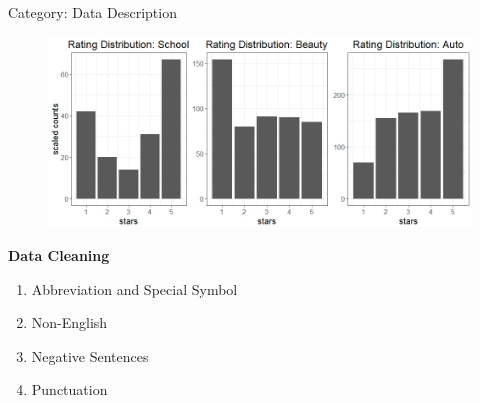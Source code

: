\documentclass[10pt]{beamer}
\begin{document}
\begin{frame}{Category: Data Description}
\begin{figure}
    \centering
    \includegraphics[scale=0.42]{cate.jpeg}
    
\end{figure}    
\end{frame}


\begin{frame}
\huge{\centerline{\textbf{Data Cleaning}}}

\begin{enumerate}[(1)]

	\item Abbreviation and Special Symbol

	\item Non-English

	\item Negative Sentences
	
	\item Punctuation

\end{enumerate}

\end{frame}


\end{document}
